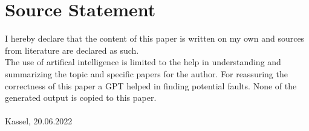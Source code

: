 \section{Source Statement}
I hereby declare that the content of this paper is written on my own and sources from literature are declared as such.\\
The use of artifical intelligence is limited to the help in understanding and summarizing the topic and specific papers for the author. For reassuring the correctness of this paper a GPT helped in finding potential faults. None of the generated output is copied to this paper. \vspace{3cm}\\
\underline{\hspace{10cm}}\\
\footnotesize Kassel, 20.06.2022 \normalsize
